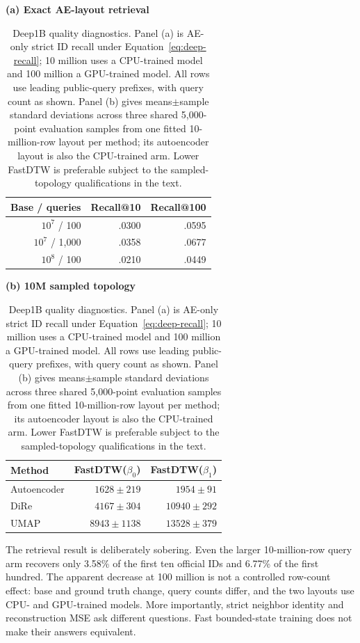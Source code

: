 \documentclass[10pt]{article}
\begin{document}
\begin{table}[ht]
\centering
\begin{minipage}[t]{0.47\textwidth}
\centering
\scriptsize
\textbf{(a) Exact AE-layout retrieval}\\[0.35em]
\begin{tabular}{rrr}
\toprule
Base / queries & Recall@10 & Recall@100\\
\midrule
$10^7$ / 100   & .0300 & .0595\\
$10^7$ / 1,000 & .0358 & .0677\\
$10^8$ / 100   & .0210 & .0449\\
\bottomrule
\end{tabular}
\end{minipage}
\hfill
\begin{minipage}[t]{0.47\textwidth}
\centering
\scriptsize
\textbf{(b) 10M sampled topology}\\[0.35em]
\begin{tabular}{lrr}
\toprule
Method & FastDTW($\beta_0$) & FastDTW($\beta_1$)\\
\midrule
Autoencoder & $1628\pm219$ & $1954\pm91$\\
DiRe        & $4167\pm304$ & $10940\pm292$\\
UMAP        & $8943\pm1138$ & $13528\pm379$\\
\bottomrule
\end{tabular}
\end{minipage}
\caption{Deep1B quality diagnostics.  Panel (a) is AE-only strict ID recall under
Equation~\eqref{eq:deep-recall}; 10 million uses a CPU-trained model and 100 million a
GPU-trained model.  All rows use leading public-query prefixes, with query count as
shown.  Panel (b) gives
means$\pm$sample standard deviations across three shared 5,000-point evaluation samples
from one fitted 10-million-row layout per method; its autoencoder layout is also the
CPU-trained arm.  Lower FastDTW is preferable subject to the sampled-topology
qualifications in the text.}
\label{tab:deep-quality}
\end{table}
\FloatBarrier

The retrieval result is deliberately sobering.  Even the larger 10-million-row query
arm recovers only 3.58\% of the first ten official IDs and 6.77\% of the first hundred.
The apparent decrease at 100 million is not a controlled row-count effect: base and
ground truth change, query counts differ, and the two layouts use CPU- and GPU-trained
models.  More importantly, strict neighbor identity and reconstruction MSE ask different
questions.  Fast bounded-state training does not make their answers equivalent.
\end{document}
